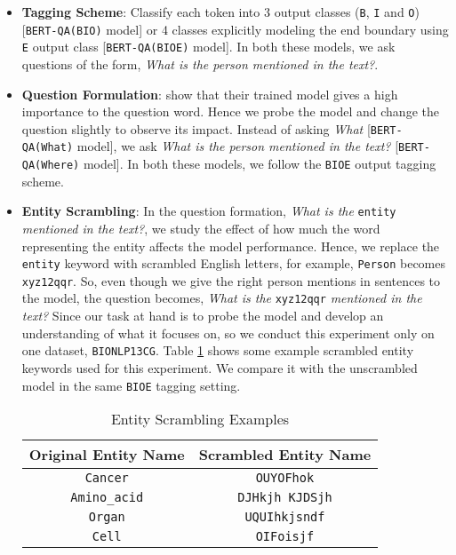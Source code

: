 \begin{itemize}
    \item \textbf{Tagging Scheme}: Classify each token into 3 output classes (\texttt{B}, \texttt{I} and \texttt{O}) [\texttt{BERT-QA(BIO)} model] or 4 classes explicitly modeling the end boundary using \texttt{E} output class [\texttt{BERT-QA(BIOE)} model]. In both these models, we ask questions of the form, \textit{What is the person mentioned in the text?}.
    
    \item \textbf{Question Formulation}: \cite{banerjee2019knowledge} show that their trained model gives a high importance to the question word. Hence we probe the model and change the question slightly to observe its impact. Instead of asking \textit{What} [\texttt{BERT-QA(What)} model], we ask \textit{What is the person mentioned in the text?} [\texttt{BERT-QA(Where)} model]. In both these models, we follow the \texttt{BIOE} output tagging scheme.
    
    \item \textbf{Entity Scrambling}: In the question formation, \textit{What is the} \texttt{entity} \textit{mentioned in the text?}, we study the effect of how much the word representing the entity affects the model performance. Hence, we replace the \texttt{entity} keyword with scrambled English letters, for example, \texttt{Person} becomes \texttt{xyz12qqr}. So, even though we give the right person mentions in sentences to the model, the question becomes, \textit{What is the} \texttt{xyz12qqr} \textit{mentioned in the text?} Since our task at hand is to probe the model and develop an understanding of what it focuses on, so we conduct this experiment only on one dataset, \texttt{BIONLP13CG}. Table \ref{tab:entity_scramble_bio} shows some example scrambled entity keywords used for this experiment. We compare it with the unscrambled model in the same \texttt{BIOE} tagging setting.
    
    \begin{table}[h!]
    \centering
    \begin{tabular}{|c|c|}\hline
    	\textbf{Original Entity Name} & \textbf{Scrambled Entity Name}\\\hline
    	\texttt{Cancer} & \texttt{OUYOFhok}\\\hline
    	\texttt{Amino\_acid} & \texttt{DJHkjh KJDSjh}\\\hline
    	\texttt{Organ} & \texttt{UQUIhkjsndf}\\\hline
    	\texttt{Cell} & \texttt{OIFoisjf}\\\hline
    	\end{tabular}
        \caption{Entity Scrambling Examples}
        \label{tab:entity_scramble_bio}
    \end{table}
\end{itemize}

